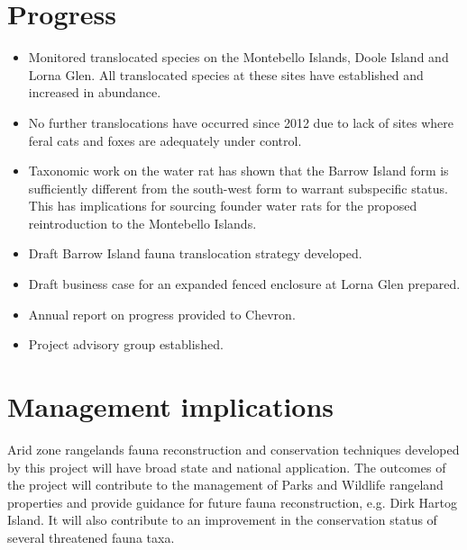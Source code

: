 \documentclass[version=last, paper=a4, DIV=18, usenames, dvipsnames]{scrartcl}
\begin{document}
\section*{Progress}
\begin{itemize}
\itemsep1pt\parskip0pt
\item
  Monitored translocated species on the Montebello Islands, Doole Island
  and Lorna Glen. All translocated species at these sites have
  established and increased in abundance.
\item
  No further translocations have occurred since 2012 due to lack of
  sites where feral cats and foxes are adequately under control.
\item
  Taxonomic work on the water rat has shown that the Barrow Island form
  is sufficiently different from the south-west form to warrant
  subspecific status. This has implications for sourcing founder water
  rats for the proposed reintroduction to the Montebello Islands.
\item
  Draft Barrow Island fauna translocation strategy developed.
\item
  Draft business case for an expanded fenced enclosure at Lorna Glen
  prepared.
\item
  Annual report on progress provided to Chevron.
\item
  Project advisory group established.
\end{itemize}



\section*{Management implications}
Arid zone rangelands fauna reconstruction and conservation techniques
developed by this project will have broad state and national
application. The outcomes of the project will contribute to the
management of Parks and Wildlife rangeland properties and provide
guidance for future fauna reconstruction, e.g. Dirk Hartog Island. It
will also contribute to an improvement in the conservation status of
several threatened fauna taxa.
\end{document}

